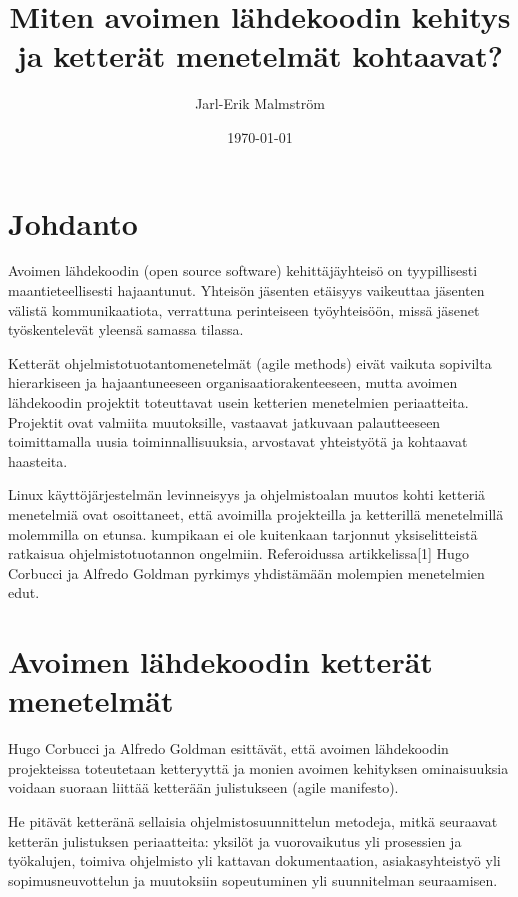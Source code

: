 \documentclass[finnish]{tktltiki2}
\title{Miten avoimen lähdekoodin kehitys ja ketterät menetelmät kohtaavat?}
\author{Jarl-Erik Malmström}
\date{\today}
\theoremstyle{definition}
\theoremstyle{remark}
\begin{document}

\maketitle        %
\makeabstract     %

\tableofcontents  %
\newpage          %



\section{Johdanto}

Avoimen lähdekoodin (open source software) kehittäjäyhteisö on tyypillisesti maantieteellisesti hajaantunut. Yhteisön jäsenten etäisyys vaikeuttaa jäsenten välistä kommunikaatiota, verrattuna perinteiseen työyhteisöön, missä jäsenet työskentelevät yleensä samassa tilassa.

Ketterät ohjelmistotuotantomenetelmät (agile methods) eivät vaikuta sopivilta hierarkiseen ja hajaantuneeseen organisaatiorakenteeseen, mutta avoimen lähdekoodin projektit toteuttavat usein ketterien menetelmien periaatteita. Projektit ovat valmiita muutoksille, vastaavat jatkuvaan palautteeseen toimittamalla uusia toiminnallisuuksia, arvostavat yhteistyötä ja kohtaavat haasteita. 

Linux käyttöjärjestelmän levinneisyys ja ohjelmistoalan muutos kohti ketteriä menetelmiä ovat osoittaneet, että avoimilla projekteilla ja ketterillä menetelmillä molemmilla on etunsa. kumpikaan ei ole kuitenkaan tarjonnut yksiselitteistä ratkaisua ohjelmistotuotannon ongelmiin. Referoidussa  artikkelissa[1] Hugo Corbucci ja Alfredo Goldman pyrkimys yhdistämään molempien menetelmien edut.
 
\section{Avoimen lähdekoodin ketterät menetelmät}

Hugo Corbucci ja Alfredo Goldman esittävät, että avoimen lähdekoodin projekteissa toteutetaan ketteryyttä ja monien avoimen kehityksen ominaisuuksia voidaan suoraan liittää ketterään julistukseen (agile manifesto). 

He pitävät ketteränä sellaisia ohjelmistosuunnittelun metodeja, mitkä seuraavat ketterän julistuksen periaatteita: yksilöt ja vuorovaikutus yli prosessien ja työkalujen, toimiva ohjelmisto yli kattavan dokumentaation, asiakasyhteistyö yli sopimusneuvottelun ja muutoksiin sopeutuminen yli suunnitelman seuraamisen.
\end{document}
